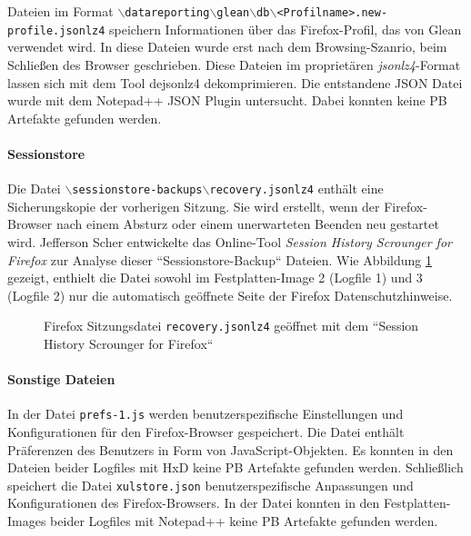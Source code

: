 \begin{appendices}
Dateien im Format \texttt{$\backslash$datareporting$\backslash$glean$\backslash$db$\backslash$<Profilname>.new-profile.jsonlz4} speichern Informationen über das Firefox-Profil, das von Glean verwendet wird. In diese Dateien wurde erst nach dem Browsing-Szanrio, beim Schließen des Browser geschrieben. Diese Dateien im proprietären \textit{jsonlz4}-Format lassen sich mit dem Tool dejsonlz4 dekomprimieren. Die entstandene JSON Datei wurde mit dem Notepad++ JSON Plugin untersucht. Dabei konnten keine PB Artefakte gefunden werden.

\paragraph*{Sessionstore}
Die Datei \texttt{$\backslash$sessionstore-backups$\backslash$recovery.jsonlz4} enthält eine Sicherungskopie der vorherigen Sitzung. Sie wird erstellt, wenn der Firefox-Browser nach einem Absturz oder einem unerwarteten Beenden neu gestartet wird. 
Jefferson Scher entwickelte das Online-Tool \textit{Session History Scrounger for Firefox} zur Analyse dieser ``Sessionstore-Backup`` Dateien. \cite{JeffersonScher.29.11.2020}
Wie Abbildung \ref{img:firefox-session-history-scrounger} gezeigt, enthielt die Datei sowohl im Festplatten-Image 2 (Logfile 1) und 3 (Logfile 2) nur die automatisch geöffnete Seite der Firefox Datenschutzhinweise.
\begin{figure}[h!]
	\caption{Firefox Sitzungsdatei \texttt{recovery.jsonlz4} geöffnet mit dem ``Session History Scrounger for Firefox``}
	\label{img:firefox-session-history-scrounger}
\end{figure}

\paragraph*{Sonstige Dateien}
In der Datei \texttt{prefs-1.js} werden benutzerspezifische Einstellungen und Konfigurationen für den Firefox-Browser gespeichert. Die Datei enthält Präferenzen des Benutzers in Form von JavaScript-Objekten. Es konnten in den Dateien beider Logfiles mit HxD keine PB Artefakte gefunden werden. 
Schließlich speichert die Datei \texttt{xulstore.json} benutzerspezifische Anpassungen und Konfigurationen des Firefox-Browsers. In der Datei konnten in den Festplatten-Images beider Logfiles mit Notepad++ keine PB Artefakte gefunden werden. \cite{mozillazine.29.12.2022}


\end{appendices}
